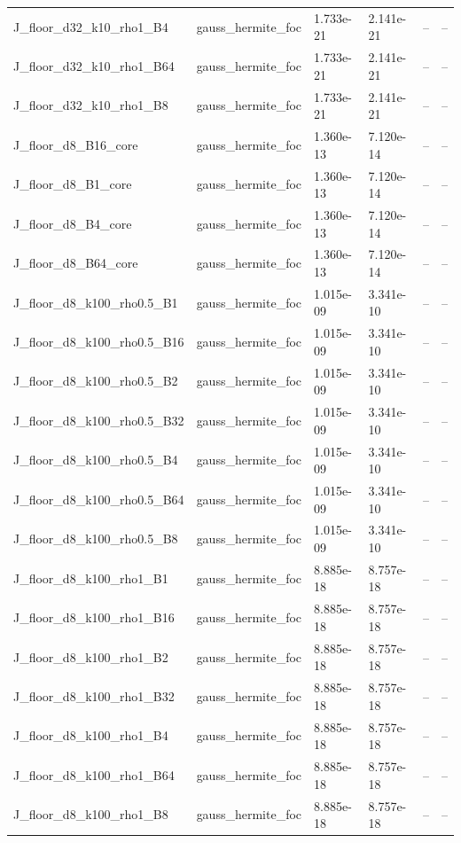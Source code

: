 \begin{tabular}{llllll}
J\_floor\_d32\_k10\_rho1\_B4 & gauss\_hermite\_foc & 1.733e-21 & 2.141e-21 & -- & -- \\
J\_floor\_d32\_k10\_rho1\_B64 & gauss\_hermite\_foc & 1.733e-21 & 2.141e-21 & -- & -- \\
J\_floor\_d32\_k10\_rho1\_B8 & gauss\_hermite\_foc & 1.733e-21 & 2.141e-21 & -- & -- \\
J\_floor\_d8\_B16\_core & gauss\_hermite\_foc & 1.360e-13 & 7.120e-14 & -- & -- \\
J\_floor\_d8\_B1\_core & gauss\_hermite\_foc & 1.360e-13 & 7.120e-14 & -- & -- \\
J\_floor\_d8\_B4\_core & gauss\_hermite\_foc & 1.360e-13 & 7.120e-14 & -- & -- \\
J\_floor\_d8\_B64\_core & gauss\_hermite\_foc & 1.360e-13 & 7.120e-14 & -- & -- \\
J\_floor\_d8\_k100\_rho0.5\_B1 & gauss\_hermite\_foc & 1.015e-09 & 3.341e-10 & -- & -- \\
J\_floor\_d8\_k100\_rho0.5\_B16 & gauss\_hermite\_foc & 1.015e-09 & 3.341e-10 & -- & -- \\
J\_floor\_d8\_k100\_rho0.5\_B2 & gauss\_hermite\_foc & 1.015e-09 & 3.341e-10 & -- & -- \\
J\_floor\_d8\_k100\_rho0.5\_B32 & gauss\_hermite\_foc & 1.015e-09 & 3.341e-10 & -- & -- \\
J\_floor\_d8\_k100\_rho0.5\_B4 & gauss\_hermite\_foc & 1.015e-09 & 3.341e-10 & -- & -- \\
J\_floor\_d8\_k100\_rho0.5\_B64 & gauss\_hermite\_foc & 1.015e-09 & 3.341e-10 & -- & -- \\
J\_floor\_d8\_k100\_rho0.5\_B8 & gauss\_hermite\_foc & 1.015e-09 & 3.341e-10 & -- & -- \\
J\_floor\_d8\_k100\_rho1\_B1 & gauss\_hermite\_foc & 8.885e-18 & 8.757e-18 & -- & -- \\
J\_floor\_d8\_k100\_rho1\_B16 & gauss\_hermite\_foc & 8.885e-18 & 8.757e-18 & -- & -- \\
J\_floor\_d8\_k100\_rho1\_B2 & gauss\_hermite\_foc & 8.885e-18 & 8.757e-18 & -- & -- \\
J\_floor\_d8\_k100\_rho1\_B32 & gauss\_hermite\_foc & 8.885e-18 & 8.757e-18 & -- & -- \\
J\_floor\_d8\_k100\_rho1\_B4 & gauss\_hermite\_foc & 8.885e-18 & 8.757e-18 & -- & -- \\
J\_floor\_d8\_k100\_rho1\_B64 & gauss\_hermite\_foc & 8.885e-18 & 8.757e-18 & -- & -- \\
J\_floor\_d8\_k100\_rho1\_B8 & gauss\_hermite\_foc & 8.885e-18 & 8.757e-18 & -- & -- \\

\end{tabular}
